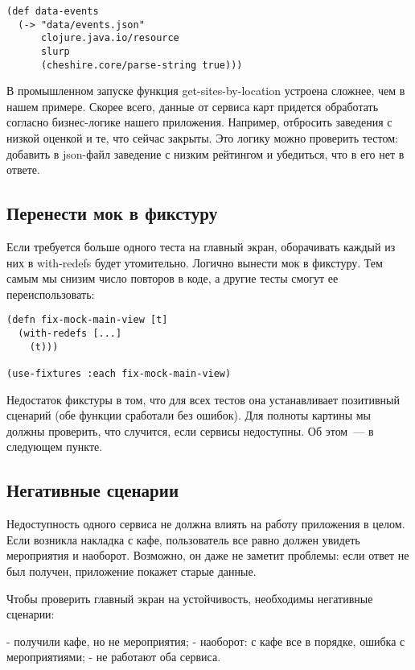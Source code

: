 \begin{verbatim}
(def data-events
  (-> "data/events.json"
      clojure.java.io/resource
      slurp
      (cheshire.core/parse-string true)))
\end{verbatim}

В промышленном запуске функция get-sites-by-location устроена сложнее, чем в
нашем примере. Скорее всего, данные от сервиса карт придется обработать согласно
бизнес-логике нашего приложения. Например, отбросить заведения с низкой оценкой
и те, что сейчас закрыты. Это логику можно проверить тестом: добавить в
json-файл заведение с низким рейтингом и убедиться, что в его нет в ответе.

\subsection{Перенести мок в фикстуру}

Если требуется больше одного теста на главный экран, оборачивать каждый из них в
with-redefs будет утомительно. Логично вынести мок в фикстуру. Тем самым мы
снизим число повторов в коде, а другие тесты смогут ее переиспользовать:

\begin{verbatim}
(defn fix-mock-main-view [t]
  (with-redefs [...]
    (t)))

(use-fixtures :each fix-mock-main-view)
\end{verbatim}

Недостаток фикстуры в том, что для всех тестов она устанавливает позитивный
сценарий (обе функции сработали без ошибок). Для полноты картины мы должны
проверить, что случится, если сервисы недоступны. Об этом~--- в следующем пункте.

\subsection{Негативные сценарии}

Недоступность одного сервиса не должна влиять на работу приложения в целом. Если
возникла накладка с кафе, пользователь все равно должен увидеть мероприятия и
наоборот. Возможно, он даже не заметит проблемы: если ответ не был получен,
приложение покажет старые данные.

Чтобы проверить главный экран на устойчивость, необходимы негативные сценарии:

- получили кафе, но не мероприятия;
- наоборот: с кафе все в порядке, ошибка с мероприятиями;
- не работают оба сервиса.

